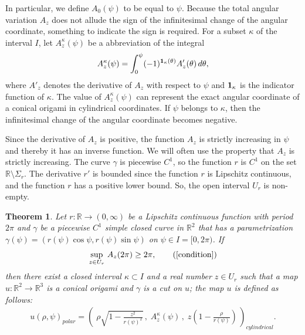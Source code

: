 \documentclass{amsart}
\theoremstyle{plain}
\newtheorem{theorem}{Theorem}[section]
\theoremstyle{definition}
\theoremstyle{remark}
\begin{document}
In particular, we define $A_0(\psi)$ to be equal to $\psi$.
Because the total angular variation $A_z$ does not allude the sign of the infinitesimal change of the angular coordinate, something to indicate the sign is required.
For a subset $\kappa$ of the interval $I$, let $A_z^{\kappa}(\psi)$ be a abbreviation of the integral
\begin{align*}
A_z^{\kappa}(\psi)=\int_0^{\psi}(-1)^{\bold{1}_{\kappa}(\theta)}A'_z(\theta)\,d\theta,
\end{align*}
where $A'_z$ denotes the derivative of $A_z$ with respect to $\psi$ and $\bold{1}_{\kappa}$ is the indicator function of $\kappa$.
The value of $A_z^{\kappa}(\psi)$ can represent the exact angular coordinate of a conical origami in cylindrical coordinates.
If $\psi$ belongs to $\kappa$, then the infinitesimal change of the angular coordinate becomes negative. 

Since the derivative of $A_z$ is positive, the function $A_z$ is strictly increasing in $\psi$ and thereby it has an inverse function.
We will often use the property that $A_z$ is strictly increasing.
The curve $\gamma$ is piecewise $C^1$, so the function $r$ is $C^1$ on the set $\mathbb{R}\setminus\Sigma_r$.
The derivative $r'$ is bounded since the function $r$ is Lipschitz continuous, and the function $r$ has a positive lower bound.
So, the open interval $U_r$ is non-empty.




\begin{theorem}\label{3.1} %
Let $r \colon \mathbb{R}\to(0,\infty)$ be a Lipschitz continuous function with period $2\pi$ and $\gamma$ be a piecewise $C^1$ simple closed curve in $\mathbb{R}^2$ that has a parametrization $\gamma(\psi)=(r(\psi)\cos\psi,r(\psi)\sin\psi)$ on $\psi\in I=[0,2\pi)$.  
If
\begin{align*}
\sup_{z\in U_r}\,A_z(2\pi)\ge2\pi, \tag{\ref{condition}}
\end{align*}
then there exist a closed interval $\kappa\subset I$ and a real number $z\in U_r$ such that a map $u \colon \mathbb{R}^2\to\mathbb{R}^3$ is a conical origami and $\gamma$ is a cut on $u$;
the map $u$ is defined as follows:
\begin{align}\label{origami}%
u(\rho,\psi)_{polar}=\left(\;\rho\sqrt{1-\frac{z^2}{r(\psi)^2}}\,,
\;A_z^{\kappa}(\psi)\,,
\;z\left(1-\frac{\rho}{r(\psi)}\right)\,\right)_{cylindrical}.
\end{align}
\end{theorem}
\end{document}
